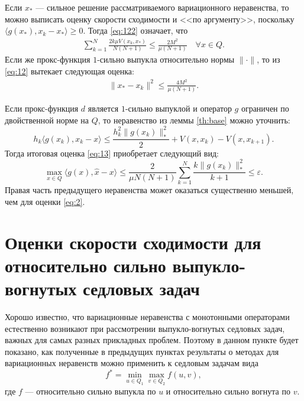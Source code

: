     \begin{remark}
        Если $x_*$ --- сильное решение рассматриваемого вариационного не\-равенства, то можно выписать оценку скорости сходимости и <<по аргументу>>, поскольку $\langle g(x_*), x_k - x_*\rangle \geq 0$. Тогда \eqref{eq:122} означает, что 
            \begin{equation} \label{eq:12}
            \begin{aligned} 
                \sum_{k=1}^{N} \frac{2k\mu V(x_k, x_*)}{N(N+1)} \leq \frac{2M^2}{\mu(N+1)} \quad  \forall x \in Q.
            \end{aligned}
            \end{equation}
        Если же прокс-функция $1$-сильно выпукла относительно нормы $\|\cdot\|$, то из \eqref{eq:12} вытекает следующая оценка:
            \begin{equation} 
            \begin{aligned} 
                \|x_* - x_k\|^2 \leq \frac{4M^2}{\mu(N+1)}.
            \end{aligned}
            \end{equation}
    \end{remark}
    \begin{remark} \label{remark4}
        Если прокс-функция $d$ является $1$-сильно выпуклой и оператор $g$ ограничен по двойственной норме на $Q$, то неравенство из леммы \ref{th:base} можно уточнить:
        \begin{equation} \label{base_eq}
            h_k \langle g(x_k), x_k - x \rangle \leq \frac{h_k^2 \|g(x_k)\|_*^2}{2} + V(x, x_k) - V(x, x_{k+1}). 
        \end{equation}
        Тогда итоговая оценка \eqref{eq:13} приобретает следующий вид:
        \begin{equation}
            \max_{x \in Q} \langle g(x), \widehat{x} - x \rangle \leq \frac{2}{\mu N (N+1)} \sum_{k=1}^{N} \frac{k \|g(x_k)\|_*^2}{k+1} \leq \varepsilon.
        \end{equation}
        Правая часть предыдущего неравенства может оказаться существенно меньшей, чем для оценки \eqref{eq:2}.
    \end{remark}

\section{Оценки скорости сходимости для относительно сильно выпукло-вогнутых седловых задач} \label{sec:ch2/sec3}

    Хорошо известно, что вариационные неравенства с монотонными операторами естественно возникают при рассмотрении выпукло-вогнутых седловых задач, важных для самых разных прикладных проблем. Поэтому в данном пункте будет показано, как полученные в предыдущих пунктах результаты о методах для вариационных неравенств можно применить к седловым задачам вида
    \begin{equation}\label{eqsedlo}
        f^* = \min_{u \in Q_1} \max_{v \in Q_2} f(u, v),
    \end{equation}
    где $f$ --- относительно сильно выпукла по $u$ и относительно сильно вогнута по $v$.


